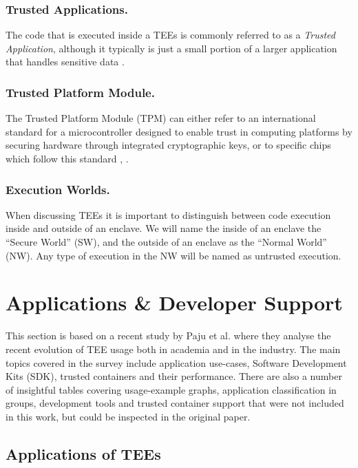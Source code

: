 \documentclass[runningheads,a4paper]{uwsese}
\begin{document}
\subsubsection{Trusted Applications.}

The code that is executed inside a TEEs is commonly referred to as a
\emph{Trusted Application}, although it typically is just a small portion of a
larger application that handles sensitive data \cite{tee_app_rev}.

\subsubsection{Trusted Platform Module.}

The Trusted Platform Module (TPM) can either refer to an international standard
for a microcontroller designed to enable trust in computing platforms by
securing hardware through integrated cryptographic keys, or to specific chips 
which follow this standard \cite{iso_11889}, \cite{wikipedia_tpm}.

\subsubsection{Execution Worlds.}

When discussing TEEs it is important to distinguish between code execution
inside and outside of an enclave. We will name the inside of an enclave the
``Secure World'' (SW), and the outside of an enclave as the ``Normal World''
(NW). Any type of execution in the NW will be named as untrusted execution.

\section{Applications \& Developer Support}


This section is based on a recent study by Paju et al. \cite{tee_app_rev} where
they analyse the recent evolution of TEE usage both in academia and in the
industry. The main topics covered in the survey include application use-cases,
Software Development Kits (SDK), trusted containers and their performance.
There are also a number of insightful tables covering usage-example graphs,
application classification in groups, development tools and trusted container
support that were not included in this work, but could be inspected in the
original paper.

\subsection{Applications of TEEs}
\end{document}
